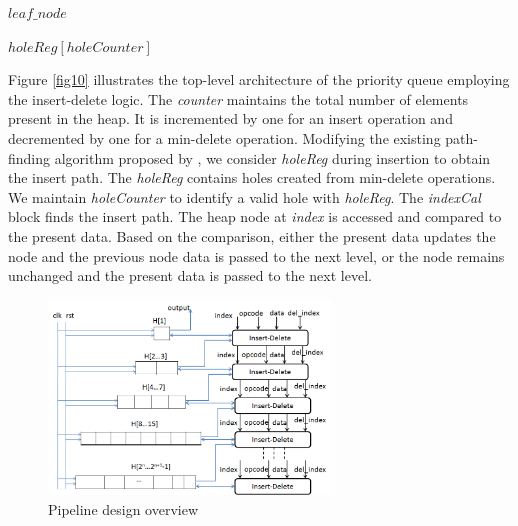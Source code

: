\documentclass[10pt, conference, compsocconf]{IEEEtran}
\begin{document}
\begin{algorithm}
\caption{$findNode(counter)$}
\label{algo3}
\begin{algorithmic}[1]
    \ENDFOR
    \RETURN $leaf\_node$
\end{algorithmic}
\end{algorithm}

\begin{algorithm}
\caption{$holeCal(holeCounter)$}
\label{algo4}
\begin{algorithmic}[1]
    \RETURN $holeReg[holeCounter]$
\end{algorithmic}
\end{algorithm}

\begin{algorithm}
\caption{$indexCal$($insert\_path$, $level$, $index$)}
\label{algo5}
\begin{algorithmic}[1]
    \ELSE
    \ENDIF
\end{algorithmic}
\end{algorithm}

Figure \ref{fig10} illustrates the top-level architecture of the priority queue employing the insert-delete logic.
The {\it counter} maintains the total number of elements present in the heap.
It is incremented by one for an insert operation and decremented by one for a min-delete operation.
Modifying the existing path-finding algorithm proposed by \cite{pq6}, we consider {\it holeReg} during insertion to obtain the insert path.
The {\it holeReg} contains holes created from min-delete operations.
We maintain {\it holeCounter} to identify a valid hole with {\it holeReg}.
The {\it indexCal} block finds the insert path.
The heap node at {\it index} is accessed and compared to the present data.
Based on the comparison, either the present data updates the node and the previous node data is passed to the next level, or the node remains unchanged and the present data is passed to the next level.


\begin{figure}[!ht]
  \centering
  \includegraphics[width=7.5cm]{Figures/1.png}
      \caption{Pipeline design overview}
    \label{fig11}
\end{figure}
\end{document}
